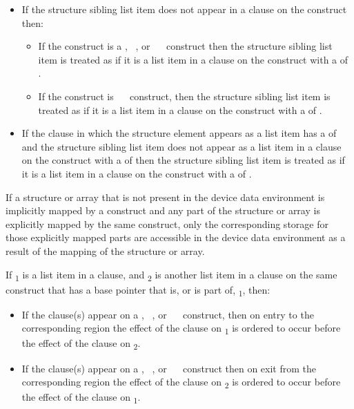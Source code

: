 \begin{itemize}
\item If the structure sibling list item does not appear in a 
      clause on the construct then:
  
\begin{itemize}
\item If the construct is a , ~,
      or ~~ construct then the structure
      sibling list item is treated as if it is a list item in a 
      clause on the construct with a  of .
\item If the construct is ~~
      construct, then the structure sibling list item is treated as if it is
      a list item in a  clause on the construct with a
       of .
\end{itemize}

\item If the  clause in which the structure element appears as a
      list item has a  of  and the structure sibling
      list item does not appear as a list item in a  clause on the
      construct with a  of  then the structure sibling
      list item is treated as if it is a list item in a  clause on the
      construct with a  of .
\end{itemize}

If a structure or array that is not present in the device data
environment is implicitly mapped by a construct and any part of the
structure or array is explicitly mapped by the same construct, only
the corresponding storage for those explicitly mapped parts are
accessible in the device data environment as a result of the mapping
of the structure or array.

If \textsubscript{1} is a list item in a  clause, and
\textsubscript{2} is another list item in a  clause on the
same construct that has a base pointer that is, or is part of,
\textsubscript{1}, then:

\begin{itemize}
\item If the  clause(s) appear on a ,
      ~, or ~~ 
      construct, then on entry to the corresponding region the effect of 
      the  clause on \textsubscript{1} is ordered to 
      occur before the effect of the  clause on \textsubscript{2}.
\item If the  clause(s) appear on a ,
      ~, or ~~ 
      construct then on exit from the corresponding region the effect of 
      the  clause on \textsubscript{2} is ordered to 
      occur before the effect of the  clause on \textsubscript{1}.
\end{itemize}

